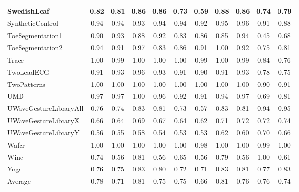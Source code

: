 \begin{table}
{\begin{tabular}{lcccccccccc}
        SwedishLeaf & 0.82 & 0.81 & 0.86 & 0.86 & 0.73 & 0.59 & 0.88 & 0.86 & 0.74 & 0.79 \\ \hline
        SyntheticControl & 0.94 & 0.94 & 0.93 & 0.94 & 0.94 & 0.92 & 0.95 & 0.96 & 0.91 & 0.88 \\ \hline
        ToeSegmentation1 & 0.90 & 0.93 & 0.88 & 0.92 & 0.83 & 0.86 & 0.85 & 0.94 & 0.45 & 0.68 \\ \hline
        ToeSegmentation2 & 0.94 & 0.91 & 0.97 & 0.83 & 0.86 & 0.91 & 1.00 & 0.92 & 0.75 & 0.81 \\ \hline
        Trace & 1.00 & 0.99 & 1.00 & 1.00 & 1.00 & 0.99 & 1.00 & 0.99 & 0.84 & 0.76 \\ \hline
        TwoLeadECG & 0.91 & 0.93 & 0.96 & 0.93 & 0.91 & 0.90 & 0.91 & 0.93 & 0.78 & 0.75 \\ \hline
        TwoPatterns & 1.00 & 1.00 & 1.00 & 1.00 & 1.00 & 1.00 & 1.00 & 1.00 & 0.90 & 0.91 \\ \hline
        UMD & 0.97 & 0.97 & 1.00 & 0.96 & 0.92 & 0.91 & 0.94 & 0.97 & 0.69 & 0.81 \\ \hline
        UWaveGestureLibraryAll & 0.76 & 0.74 & 0.83 & 0.81 & 0.73 & 0.57 & 0.83 & 0.81 & 0.94 & 0.95 \\ \hline
        UWaveGestureLibraryX & 0.66 & 0.64 & 0.69 & 0.67 & 0.64 & 0.62 & 0.71 & 0.72 & 0.72 & 0.74 \\ \hline
        UWaveGestureLibraryY & 0.56 & 0.55 & 0.58 & 0.54 & 0.53 & 0.53 & 0.62 & 0.60 & 0.70 & 0.66 \\ \hline
        Wafer & 1.00 & 1.00 & 1.00 & 1.00 & 1.00 & 0.98 & 1.00 & 1.00 & 0.99 & 1.00 \\ \hline
        Wine & 0.74 & 0.56 & 0.81 & 0.56 & 0.65 & 0.56 & 0.79 & 0.56 & 1.00 & 0.61 \\ \hline
        Yoga & 0.76 & 0.75 & 0.83 & 0.80 & 0.72 & 0.71 & 0.83 & 0.81 & 0.77 & 0.83 \\
        \bottomrule
        Average & 0.78	& 0.71	& 0.81	& 0.75	& 0.75	&0.66 &	0.81 &	0.76 &	0.76 &	0.74\\
        \bottomrule
\end{tabular}}
\end{table}